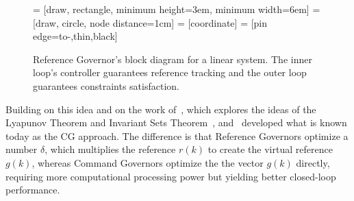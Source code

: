 \begin{figure}
  \centering
      = [draw, rectangle, minimum height=3em, minimum width=6em]
        = [draw, circle, node distance=1cm]
      = [coordinate]
   = [pin edge={to-,thin,black}]
  \caption[Reference Governor's block diagram for a linear system.]{Reference
    Governor's block diagram for a linear system. The inner loop's controller
    guarantees reference tracking and the outer loop guarantees constraints
    satisfaction.}%
  \label{fig:rg-block-diagram}
\end{figure}

Building on this idea and on the work of~\textcite{kapasouris.athans.ea:design},
which explores the ideas of the Lyapunov Theorem and Invariant Sets
Theorem~\parencite{blanchini.miani:set-theoretic},
\textcite{bemporad.casavola.ea:nonlinear}
and~\textcite{casavola.mosca.ea:robust} developed what is known today as the
\acf{CG} approach. The difference is that Reference Governors optimize a number
\(\delta\), which multiplies the reference \(r(k)\) to create the virtual reference
\(g(k)\), whereas Command Governors optimize the the vector \(g(k)\) directly,
requiring more computational processing power but yielding better closed-loop
performance.

